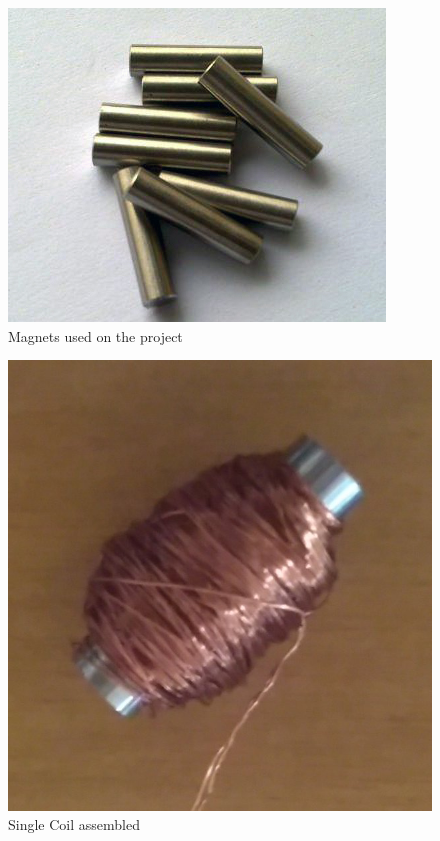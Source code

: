 \begin{figure}[!htpb]
  \centering
  \caption{Magnets used on the project}
  \label{magnets}
  \includegraphics[scale=0.3]{images/magnets}
\end{figure}

\begin{figure}[!htpb]
  \centering
  \caption{Single Coil assembled}
  \label{coils}
  \includegraphics[scale=0.15]{images/coils}
\end{figure}

